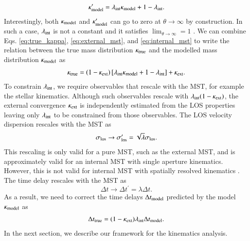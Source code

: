 \documentclass[longauth]{aa}
\newcommand{\ajs}[1]{{{#1}}}
\newcommand{\suyu}[1]{{{#1}}}
\begin{document}
%
\begin{equation} \label{eq:internal_mst}
        \kappa_{\rm model}' = \lambda_{\rm int} \kappa_{\rm model} + 1 - \lambda_{\rm int}.
\end{equation}
%
Interestingly, both $\kappa_{\rm model}$ and $\kappa_{\rm model}^{\prime}$ can go to zero at $\theta \to \infty$ by construction. In such a case, $\lambda_{\rm int}$ is not a constant and it satisfies $\lim_{\theta \to \infty} = 1$ \citep{Schneider14}. We can combine Eqs. \ref{eq:true_kappa}, \ref{eq:external_mst}, and \ref{eq:internal_mst} to write the relation between the true mass distribution $\kappa_{\rm true}$ and the modelled mass distribution $\kappa_{\rm model}$ as
%
\begin{equation}
        \kappa_{\rm true} = (1 - \kappa_{\rm ext}) \left[\lambda_{\rm int}\kappa_{\rm model} + 1 -\lambda_{\rm int} \right] + \kappa_{\rm ext}.
\end{equation}
%
To constrain $\lambda_{\rm int}$, we require observables that rescale with the MST, for example the stellar kinematics. Although such observables rescale with $\lambda_{\rm int}(1- \kappa_{\rm ext})$, the external convergence $\kappa_{\rm ext}$ is independently estimated from the LOS properties leaving only $\lambda_{\rm int}$ to be constrained from those observables. The LOS velocity dispersion rescales with the MST as
%
\begin{equation}
                \sigma_{\rm los} \to \sigma_{\rm los}^{\prime} = \sqrt{\lambda}\sigma_{\rm los}.
\end{equation}
%
This rescaling is only valid for a pure MST, \ajs{such as} the external MST, and is approximately valid for an internal MST with single aperture kinematics. However, this is not valid for internal MST with spatially resolved kinematics \citep[][]{Chen21, Yildirim21}. The time delay rescales with the MST as
%
\begin{equation}
        \Delta t \to \Delta t^{\prime} = \lambda \Delta t.
\end{equation}
%
As a result, we need to correct the time delays $\Delta t_{\rm model}$ predicted by the model $\kappa_{\rm model}$ as 
%
\begin{equation}
\label{eq:time_delay_true}
        \Delta t_{\rm true} = (1 - \kappa_{\rm ext}) \lambda_{\rm int} \Delta t_{\rm model}.
\end{equation}
%
In the next section, we describe our framework for \ajs{the} kinematics analysis.
\end{document}
